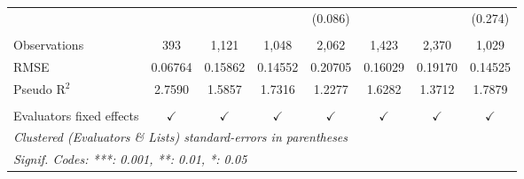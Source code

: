 \begin{tabular}{lccccccc}
                            &               &               &               & (0.086)       &               &               & (0.274)\\   
    \\
   Observations             & 393           & 1,121         & 1,048         & 2,062         & 1,423         & 2,370         & 1,029\\  
   RMSE                     & 0.06764       & 0.15862       & 0.14552       & 0.20705       & 0.16029       & 0.19170       & 0.14525\\  
   Pseudo R$^2$             & 2.7590        & 1.5857        & 1.7316        & 1.2277        & 1.6282        & 1.3712        & 1.7879\\  
    \\
   Evaluators fixed effects & $\checkmark$  & $\checkmark$  & $\checkmark$  & $\checkmark$  & $\checkmark$  & $\checkmark$  & $\checkmark$\\   
   \bottomrule
   \multicolumn{8}{l}{\emph{Clustered (Evaluators \& Lists) standard-errors in parentheses}}\\
   \multicolumn{8}{l}{\emph{Signif. Codes: ***: 0.001, **: 0.01, *: 0.05}}\\
\end{tabular}
\par\endgroup


